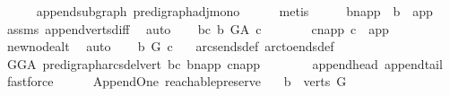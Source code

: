 \begin{isabellebody}
\ \ \ \ \isamarkupfalse%
\ append{\isacharunderscore}{\kern0pt}subgraph\ pre{\isacharunderscore}{\kern0pt}digraph{\isachardot}{\kern0pt}adj{\isacharunderscore}{\kern0pt}mono\isanewline
\ \ \ \ \isamarkupfalse%
\ metis\isanewline
{}\isamarkupfalse%
\ \isanewline
\ \ \isamarkupfalse%
\ b{\isacharunderscore}{\kern0pt}napp\ {\isacharcolon}{\kern0pt}\ {\isachardoublequoteopen}b\ {\isasymnoteq}\ app{\isachardoublequoteclose}\ \isamarkupfalse%
\ assms{\isacharparenleft}{\kern0pt}{}{\isacharparenright}{\kern0pt}\ append{\isacharunderscore}{\kern0pt}verts{\isacharunderscore}{\kern0pt}diff\ \isamarkupfalse%
\ auto\isanewline
\ \ \isamarkupfalse%
\ bc{\isacharcolon}{\kern0pt}\ {\isachardoublequoteopen}b\ {\isasymrightarrow}\isactrlbsub G{\isacharunderscore}{\kern0pt}A\isactrlesub \ c{\isachardoublequoteclose}\ \isanewline
\ \ \isamarkupfalse%
\ \isamarkupfalse%
\ \ c{\isacharunderscore}{\kern0pt}napp{\isacharcolon}{\kern0pt}\ {\isachardoublequoteopen}c\ {\isasymnoteq}\ app{\isachardoublequoteclose}\ \isamarkupfalse%
\ new{\isacharunderscore}{\kern0pt}node{\isacharunderscore}{\kern0pt}alt\ \isamarkupfalse%
\ auto\isanewline
\ \ \isamarkupfalse%
\ {\isachardoublequoteopen}b\ {\isasymrightarrow}\isactrlbsub G\isactrlesub \ c{\isachardoublequoteclose}\ \ \isamarkupfalse%
\ arcs{\isacharunderscore}{\kern0pt}ends{\isacharunderscore}{\kern0pt}def\ arc{\isacharunderscore}{\kern0pt}to{\isacharunderscore}{\kern0pt}ends{\isacharunderscore}{\kern0pt}def\isanewline
\ \ \ \ \ \ \isamarkupfalse%
\ GG{\isacharunderscore}{\kern0pt}A\ pre{\isacharunderscore}{\kern0pt}digraph{\isachardot}{\kern0pt}arcs{\isacharunderscore}{\kern0pt}del{\isacharunderscore}{\kern0pt}vert\ bc\ b{\isacharunderscore}{\kern0pt}napp\ c{\isacharunderscore}{\kern0pt}napp\isanewline
\ \ \ \ \ \ \isamarkupfalse%
\ append{\isacharunderscore}{\kern0pt}head\ append{\isacharunderscore}{\kern0pt}tail\ \isamarkupfalse%
\ fastforce\ \isanewline
\ \ \isamarkupfalse%
%
\endisatagproof
{\isafoldproof}%
%
\isadelimproof
\isanewline
%
\endisadelimproof
\isanewline
\isanewline
{}\isamarkupfalse%
\ {\isacharparenleft}{\kern0pt}\ Append{\isacharunderscore}{\kern0pt}One{\isacharparenright}{\kern0pt}\ reachable{}{\isacharunderscore}{\kern0pt}preserve{\isacharcolon}{\kern0pt}\isanewline
\ \ \ {\isachardoublequoteopen}b\ {\isasymin}\ verts\ G{\isachardoublequoteclose}\isanewline

\end{isabellebody}
